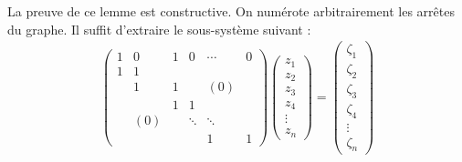 \documentclass[twoside,11pt,openany,a4paper]{rapport}
\begin{document}
La preuve de ce lemme est constructive. On numérote arbitrairement les arrêtes du graphe. Il suffit d'extraire le sous-système suivant :
\begin{gather}\label{Système linéaire extrait}
  \left(
  \begin{array}{cccccc}
    1 & 0   & 1 & 0      & \cdots & 0 \\
    1 & 1   &   &        &        &   \\
      & 1   & 1 &        & (0)    &   \\
      &     & 1 & 1      &        &   \\
      & (0) &   & \ddots & \ddots &   \\
      &     &   &        & 1      & 1
  \end{array} \right)
  \left(
  \begin{array}{c}
    z_1 \\
    z_2 \\
    z_3 \\
    z_4 \\
    \vdots \\
    z_n
  \end{array} \right)
  =
  \left(
  \begin{array}{c}
    \zeta_1 \\
    \zeta_2 \\
    \zeta_3 \\
    \zeta_4 \\
    \vdots  \\
    \zeta_n
  \end{array} \right)
\end{gather}
\end{document}
